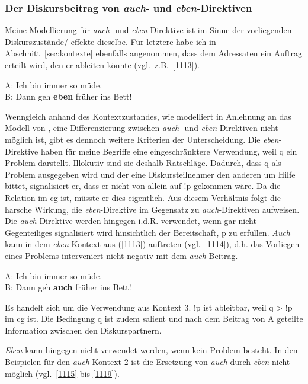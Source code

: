 \subsubsection{Der Diskursbeitrag von \textit{auch}- und \textit{eben}-Direktiven}
Meine Modellierung für \textit{auch}- und \textit{eben}-Direktive ist im Sinne der vorliegenden Diskurszustände\slash-effekte dieselbe. Für letztere habe ich in Abschnitt~\ref{sec:kontexte} ebenfalls angenommen, dass dem Adressaten ein Auftrag erteilt wird, den er ableiten könnte (vgl.\ z.B.\ \ref{1113}).\largerpage

\begin{exe}
	\ex\label{1113} 
	A: Ich bin immer so müde.\\
	B: Dann geh \textbf{eben} früher ins Bett!
\end{exe}
Wenngleich anhand des Kontextzustandes, wie modelliert in Anlehnung an das Modell von \citet{Farkas2010}, eine Differenzierung zwischen \textit{auch}- und \textit{eben}-Direktiven nicht möglich ist, gibt es dennoch weitere Kriterien der Unterscheidung. Die \textit{eben}-Direktive haben für meine Begriffe eine eingeschränktere Verwendung, weil q ein Problem darstellt. Illokutiv sind sie deshalb  Ratschläge. Dadurch, dass q als Problem ausgegeben wird und der eine Diskursteilnehmer den anderen um Hilfe bittet, signalisiert er, dass er nicht von allein auf !p gekommen wäre. Da die Relation im cg ist, müsste er dies eigentlich. Aus diesem Verhältnis folgt die harsche Wirkung, die \textit{eben}-Direktive im Gegensatz zu \textit{auch}-Direktiven aufweisen. Die \textit{auch}-Direktive werden hingegen i.d.R. verwendet, wenn gar nicht Gegenteiliges signalisiert wird hinsichtlich der Bereitschaft, p zu erfüllen. 							
\textit{Auch} kann in dem \textit{eben}-Kontext aus (\ref{1113}) auftreten (vgl.\ \ref{1114}), d.h. das Vorliegen eines Problems interveniert nicht negativ mit dem \textit{auch}-Beitrag.

\begin{exe}
	\ex\label{1114} 
	A: Ich bin immer so müde.\\
	B: Dann geh \textbf{auch} früher ins Bett!
\end{exe}
Es handelt sich um die Verwendung aus Kontext 3. !p ist ableitbar, weil q > !p im cg ist. Die Bedingung q ist zudem salient und nach dem Beitrag von A geteilte Information zwischen den Diskurspartnern.

\textit{Eben} kann hingegen nicht verwendet werden, wenn kein Problem besteht. In den Beispielen für den \textit{auch}-Kontext 2 ist die Ersetzung von \textit{auch} durch \textit{eben} nicht möglich (vgl.\ \ref{1115} bis \ref{1119}).
	
